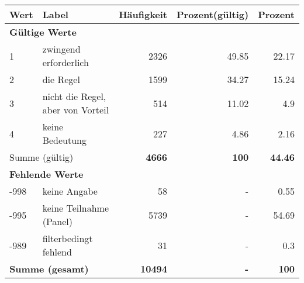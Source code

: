      \begin{longtable}{lXrrr}
     \toprule
     \textbf{Wert} & \textbf{Label} & \textbf{Häufigkeit} & \textbf{Prozent(gültig)} & \textbf{Prozent} \\
     \endhead
     \midrule
     \multicolumn{5}{l}{\textbf{Gültige Werte}}\\

     1 &
     \multicolumn{1}{X}{ zwingend erforderlich   } &


       \num{2326} &
       \num[round-mode=places,round-precision=2]{49.85} &
         \num[round-mode=places,round-precision=2]{22.17} \\

     2 &
     \multicolumn{1}{X}{ die Regel   } &


       \num{1599} &
       \num[round-mode=places,round-precision=2]{34.27} &
         \num[round-mode=places,round-precision=2]{15.24} \\

     3 &
     \multicolumn{1}{X}{ nicht die Regel, aber von Vorteil   } &


       \num{514} &
       \num[round-mode=places,round-precision=2]{11.02} &
         \num[round-mode=places,round-precision=2]{4.9} \\

     4 &
     \multicolumn{1}{X}{ keine Bedeutung   } &


       \num{227} &
       \num[round-mode=places,round-precision=2]{4.86} &
         \num[round-mode=places,round-precision=2]{2.16} \\
     \midrule
     \multicolumn{2}{l}{Summe (gültig)} &
       \textbf{\num{4666}} &
     \textbf{\num{100}} &
       \textbf{\num[round-mode=places,round-precision=2]{44.46}} \\
     \multicolumn{5}{l}{\textbf{Fehlende Werte}}\\
       -998 &
       keine Angabe &
         \num{58} &
        - &
         \num[round-mode=places,round-precision=2]{0.55} \\
       -995 &
       keine Teilnahme (Panel) &
         \num{5739} &
        - &
         \num[round-mode=places,round-precision=2]{54.69} \\
       -989 &
       filterbedingt fehlend &
         \num{31} &
        - &
         \num[round-mode=places,round-precision=2]{0.3} \\
     \midrule
     \multicolumn{2}{l}{\textbf{Summe (gesamt)}} &
          \textbf{\num{10494}} &
        \textbf{-} &
        \textbf{\num{100}} \\
     \bottomrule
     \end{longtable}
     
